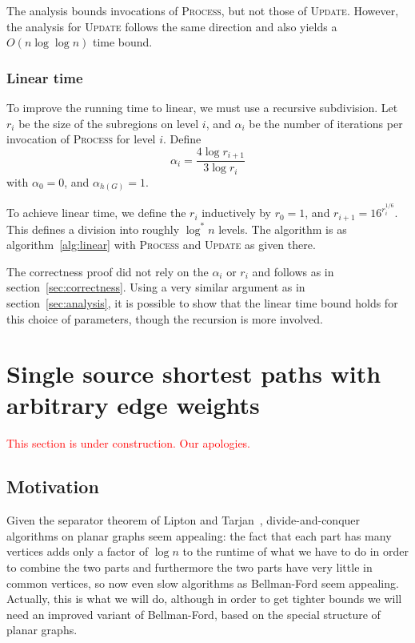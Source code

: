 \documentclass[12pt]{article}
\begin{document}
The analysis bounds invocations of \textsc{Process}, but not those of \textsc{Update}. However, the analysis for \textsc{Update} follows the same direction and also yields a $O(n \log \log n)$ time bound.

\subsubsection{Linear time}
\label{sec:linear-time}

To improve the running time to linear, we must use a recursive subdivision. Let $r_i$ be the size of the subregions on level $i$, and $\alpha_i$ be the number of iterations per invocation of \textsc{Process} for level $i$. Define
\[
  \alpha_i = \frac{4\log r_{i+1}}{3 \log r_i}
\]
with $\alpha_0 = 0$, and $\alpha_{h(G)} = 1$.

To achieve linear time, we define the $r_i$ inductively by $r_0 = 1$, and $r_{i+1} = 16^{r_i^{1/6}}$. This defines a division into roughly $\log^{*} n$ levels. The algorithm is as algorithm~\ref{alg:linear} with \textsc{Process} and \textsc{Update} as given there.

The correctness proof did not rely on the $\alpha_i$ or $r_i$ and follows as in section~\ref{sec:correctness}. Using a very similar argument as in section~\ref{sec:analysis}, it is possible to show that the linear time bound holds for this choice of parameters, though the recursion is more involved.

\section{Single source shortest paths with arbitrary edge weights}
\label{sec:arbitr-edge-weights}

\textcolor{red}{This section is under construction. Our apologies.}

\subsection{Motivation}
\label{sec:arbitr-motiv}

Given the separator theorem of Lipton and Tarjan~\cite{lipton1979separator}, divide-and-conquer algorithms on planar graphs seem appealing: the fact that each part has many vertices adds only a factor of $\log n$ to the runtime of what we have to do in order to combine the two parts and furthermore the two parts have very little in common vertices, so now even slow algorithms as Bellman-Ford seem appealing. Actually, this is what we will do, although in order to get tighter bounds we will need an improved variant of Bellman-Ford, based on the special structure of planar graphs.
\end{document}
